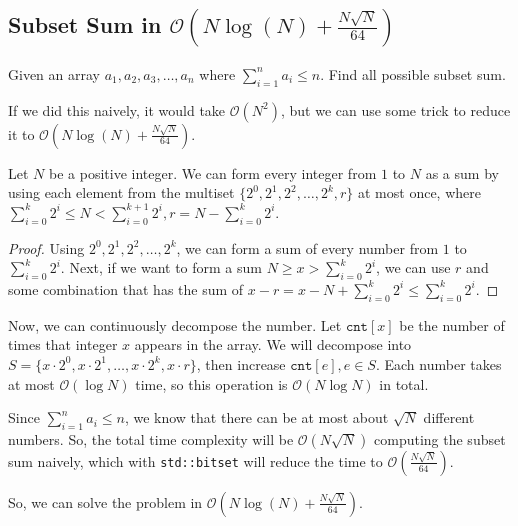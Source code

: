 \subsection{Subset Sum in \texorpdfstring{$\mathcal{O}(N\log(N) + \frac{N\sqrt{N}}{64})$}{O(N log N + sqrt(N) / 64)}}

\begin{problem}
    Given an array $a_1, a_2, a_3, \dots, a_n$ where $\sum_{i=1}^{n}a_i \le n$. Find all possible subset sum.
\end{problem}

If we did this naively, it would take $\mathcal{O}(N^2)$, but we can use some trick to reduce it to $\mathcal{O}(N\log(N) + \frac{N\sqrt{N}}{64})$.

\begin{lemma}
    Let $N$ be a positive integer. We can form every integer from $1$ to $N$ as a sum by using each element from the multiset $\{2^0, 2^1, 2^2, \dots, 2^k, r\}$ at most once, where $\sum_{i=0}^{k}2^i \le N < \sum_{i=0}^{k+1}2^i, r = N - \sum_{i=0}^{k}2^i$.
\end{lemma}

\begin{proof}
    Using $2^0, 2^1, 2^2, \dots, 2^k$, we can form a sum of every number from $1$ to $\sum_{i=0}^{k}2^i$. Next, if we want to form a sum $N \ge x > \sum_{i=0}^{k}2^i$, we can use $r$ and some combination that has the sum of $x - r = x - N + \sum_{i=0}^{k}2^i \le \sum_{i=0}^{k}2^i$.
\end{proof}

Now, we can continuously decompose the number. Let $\texttt{cnt}[x]$ be the number of times
that integer $x$ appears in the array. We will decompose into $S = \{x\cdot2^0, x\cdot2^1, \dots, x\cdot2^k, x\cdot r\}$, then increase $\texttt{cnt}[e], e \in S$. Each number takes at most $\mathcal{O}(\log{N})$ time, so this operation is $\mathcal{O}(N\log{N})$ in total.

Since $\sum_{i=1}^{n}a_i \le n$, we know that there can be at most about $\sqrt{N}$ different numbers. So, the total time complexity will be $\mathcal{O}(N\sqrt{N})$ computing the subset sum naively, which with \texttt{std::bitset} will reduce the time to $\mathcal{O}(\frac{N\sqrt{N}}{64})$.

So, we can solve the problem in $\mathcal{O}(N\log(N) + \frac{N\sqrt{N}}{64})$.

\break